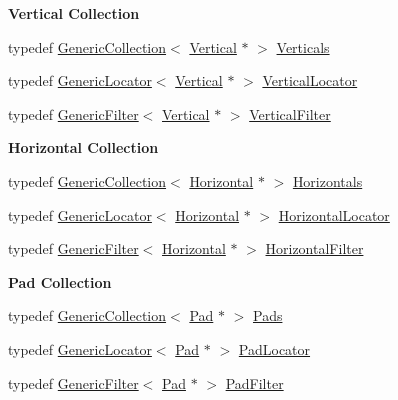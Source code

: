 \begin{Indent}\textbf{ Vertical Collection}\par
\begin{DoxyCompactItemize}
\item 
typedef \hyperlink{classHurricane_1_1GenericCollection}{Generic\+Collection}$<$ \hyperlink{classHurricane_1_1Vertical}{Vertical} $\ast$ $>$ \hyperlink{namespaceHurricane_a146e2d3d34b4035aff422f12e85345b9}{Verticals}
\item 
typedef \hyperlink{classHurricane_1_1GenericLocator}{Generic\+Locator}$<$ \hyperlink{classHurricane_1_1Vertical}{Vertical} $\ast$ $>$ \hyperlink{namespaceHurricane_a0b7ececb547a716d7d509210a271aae4}{Vertical\+Locator}
\item 
typedef \hyperlink{classHurricane_1_1GenericFilter}{Generic\+Filter}$<$ \hyperlink{classHurricane_1_1Vertical}{Vertical} $\ast$ $>$ \hyperlink{namespaceHurricane_a3ac8462f707e425944df83c57835b13d}{Vertical\+Filter}
\end{DoxyCompactItemize}
\end{Indent}
\begin{Indent}\textbf{ Horizontal Collection}\par
\begin{DoxyCompactItemize}
\item 
typedef \hyperlink{classHurricane_1_1GenericCollection}{Generic\+Collection}$<$ \hyperlink{classHurricane_1_1Horizontal}{Horizontal} $\ast$ $>$ \hyperlink{namespaceHurricane_a721e644c7d97f2f66049ab062140b855}{Horizontals}
\item 
typedef \hyperlink{classHurricane_1_1GenericLocator}{Generic\+Locator}$<$ \hyperlink{classHurricane_1_1Horizontal}{Horizontal} $\ast$ $>$ \hyperlink{namespaceHurricane_a7f4e07165be3dfcec8786e88370bdb67}{Horizontal\+Locator}
\item 
typedef \hyperlink{classHurricane_1_1GenericFilter}{Generic\+Filter}$<$ \hyperlink{classHurricane_1_1Horizontal}{Horizontal} $\ast$ $>$ \hyperlink{namespaceHurricane_a56eb48037c2e1295fafe761bf179bf01}{Horizontal\+Filter}
\end{DoxyCompactItemize}
\end{Indent}
\begin{Indent}\textbf{ Pad Collection}\par
\begin{DoxyCompactItemize}
\item 
typedef \hyperlink{classHurricane_1_1GenericCollection}{Generic\+Collection}$<$ \hyperlink{classHurricane_1_1Pad}{Pad} $\ast$ $>$ \hyperlink{namespaceHurricane_abd1f433c44d8b515e1b8a8810aea1610}{Pads}
\item 
typedef \hyperlink{classHurricane_1_1GenericLocator}{Generic\+Locator}$<$ \hyperlink{classHurricane_1_1Pad}{Pad} $\ast$ $>$ \hyperlink{namespaceHurricane_a733c2eb75cde14a8b6a2e62edfbd2792}{Pad\+Locator}
\item 
typedef \hyperlink{classHurricane_1_1GenericFilter}{Generic\+Filter}$<$ \hyperlink{classHurricane_1_1Pad}{Pad} $\ast$ $>$ \hyperlink{namespaceHurricane_aeff6d8148675fc30f366906bfc652c25}{Pad\+Filter}
\end{DoxyCompactItemize}
\end{Indent}
